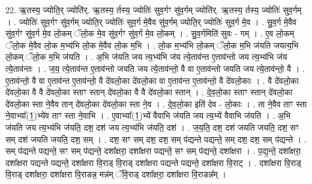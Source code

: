 \documentclass[17pt]{extarticle}
\begin{document}
22. ऋ॒तस्य॒ ज्योति॒र् ज्योति॑र्. ऋ॒तस्य॒ र्तस्य॒ ज्योतिः॑ सुव॒र्गꣳ सु॑व॒र्गम् ज्योति॑र्. ऋ॒तस्य॒ र्तस्य॒ ज्योतिः॑ सुव॒र्गम् । . ज्योतिः॑ सुव॒र्गꣳ सु॑व॒र्गम् ज्योति॒र् ज्योतिः॑ सुव॒र्ग मे॒वैव सु॑व॒र्गम् ज्योति॒र् ज्योतिः॑ सुव॒र्ग मे॒व । . सु॒व॒र्ग मे॒वैव सु॑व॒र्गꣳ सु॑व॒र्ग मे॒व लो॒कम् ॅलो॒क मे॒व सु॑व॒र्गꣳ सु॑व॒र्ग मे॒व लो॒कम् । . सु॒व॒र्गमिति॑ सुवः - गम् । . ए॒व लो॒कम् ॅलो॒क मे॒वैव लो॒क म॒भ्य॑भि लो॒क मे॒वैव लो॒क म॒भि । . लो॒क म॒भ्य॑भि लो॒कम् ॅलो॒क म॒भि ज॑यति जयत्य॒भि लो॒कम् ॅलो॒क म॒भि ज॑यति । . अ॒भि ज॑यति जय त्य॒भ्य॑भि ज॑य त्ये॒ताव॑न्त ए॒ताव॑न्तो जय त्य॒भ्य॑भि ज॑य त्ये॒ताव॑न्तः । . ज॒य॒ त्ये॒ताव॑न्त ए॒ताव॑न्तो जयति जय त्ये॒ताव॑न्तो॒ वै वा ए॒ताव॑न्तो जयति जय त्ये॒ताव॑न्तो॒ वै । . ए॒ताव॑न्तो॒ वै वा ए॒ताव॑न्त ए॒ताव॑न्तो॒ वै दे॑वलो॒का दे॑वलो॒का वा ए॒ताव॑न्त ए॒ताव॑न्तो॒ वै दे॑वलो॒काः । . वै दे॑वलो॒का दे॑वलो॒का वै वै दे॑वलो॒का स्ताꣳ स्तान् दे॑वलो॒का वै वै दे॑वलो॒का स्तान् । . दे॒व॒लो॒का स्ताꣳ स्तान् दे॑वलो॒का दे॑वलो॒का स्ता ने॒वैव तान् दे॑वलो॒का दे॑वलो॒का स्ता ने॒व । . दे॒व॒लो॒का इति॑ देव - लो॒काः । . ता ने॒वैव ताꣳ स्ता ने॒वाभ्या᳚(1॒)भ्ये॑व ताꣳ स्ता ने॒वाभि । . ए॒वाभ्या᳚(1॒)भ्ये॑ वैवाभि ज॑यति जय त्य॒भ्ये॑ वैवाभि ज॑यति । . अ॒भि ज॑यति जय त्य॒भ्य॑भि ज॑यति॒ दश॒ दश॑ जय त्य॒भ्य॑भि ज॑यति॒ दश॑ । . ज॒य॒ति॒ दश॒ दश॑ जयति जयति॒ दश॒ सꣳ सम् दश॑ जयति जयति॒ दश॒ सम् । . दश॒ सꣳ सम् दश॒ दश॒ सम् प॑द्यन्ते पद्यन्ते॒ सम् दश॒ दश॒ सम् प॑द्यन्ते । . सम् प॑द्यन्ते पद्यन्ते॒ सꣳ सम् प॑द्यन्ते॒ दशा᳚क्षरा॒ दशा᳚क्षरा पद्यन्ते॒ सꣳ सम् प॑द्यन्ते॒ दशा᳚क्षरा । . प॒द्य॒न्ते॒ दशा᳚क्षरा॒ दशा᳚क्षरा पद्यन्ते पद्यन्ते॒ दशा᳚क्षरा वि॒राड् वि॒राड् दशा᳚क्षरा पद्यन्ते पद्यन्ते॒ दशा᳚क्षरा वि॒राट् । . दशा᳚क्षरा वि॒राड् वि॒राड् दशा᳚क्षरा॒ दशा᳚क्षरा वि॒राडन्न॒ मन्न॑म् ॅवि॒राड् दशा᳚क्षरा॒ दशा᳚क्षरा वि॒राडन्न᳚म् । \newline
\end{document}
